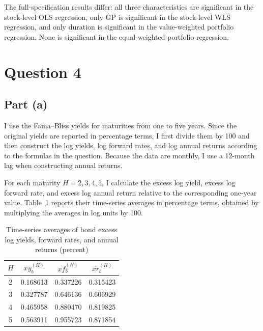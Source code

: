 \documentclass[11pt]{article}
\begin{document}
The full-specification results differ: all three characteristics are significant in the stock-level OLS regression, only GP is significant in the stock-level WLS regression, and only duration is significant in the value-weighted portfolio regression. None is significant in the equal-weighted portfolio regression. 



\clearpage

\section{Question 4}

\subsection{Part (a)}
I use the Fama--Bliss yields for maturities from one to five years. Since the original yields are reported in percentage terms, I first divide them by 100 and then construct the log yields, log forward rates, and log annual returns according to the formulas in the question. 
Because the data are monthly, I use a 12-month lag when constructing annual returns.

For each maturity $H=2,3,4,5$, I calculate the excess log yield, excess log forward rate, and excess log annual return relative to the corresponding one-year value. Table~\ref{tab:q4a_bond_averages} reports their time-series averages in percentage terms, obtained by multiplying the averages in log units by 100.

\begin{table}[htbp]
    \centering
    \caption{Time-series averages of bond excess log yields, forward rates, and annual returns (percent)}
    \label{tab:q4a_bond_averages}
    \begin{tabular}{cccc}
        \toprule
        $H$ & $\overline{xy}^{(H)}_b$ & $\overline{xf}^{(H)}_b$ & $\overline{xr}^{(H)}_b$ \\
        \midrule
        2 & 0.168613 & 0.337226 & 0.315423 \\
        3 & 0.327787 & 0.646136 & 0.606929 \\
        4 & 0.465958 & 0.880470 & 0.819825 \\
        5 & 0.563911 & 0.955723 & 0.871854 \\
        \bottomrule
    \end{tabular}
\end{table}
\end{document}

